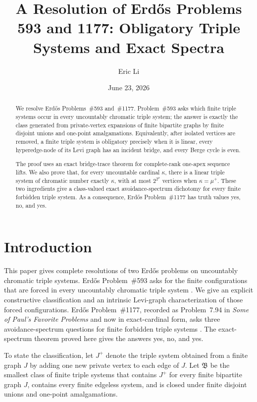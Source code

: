 \documentclass[11pt]{amsart}
\author@andify\authors
\title[Erd\H{o}s Problems 593 and 1177]
{A Resolution of Erd\H{o}s Problems 593 and 1177: Obligatory Triple Systems and Exact Spectra}
\author{Eric Li}
\affiliation{Trinity College, University of Cambridge}
\date{June 23, 2026}
\theoremstyle{definition}
\theoremstyle{remark}
\numberwithin{equation}{section}
\newcommand{\Bclass}{\mathfrak B}
\begin{document}
\begin{abstract}
We resolve Erd\H{o}s Problems~\#593 and~\#1177.  Problem~\#593 asks which
finite triple systems occur in every uncountably chromatic triple system; the
answer is exactly the class generated from private-vertex expansions of finite
bipartite graphs by finite disjoint unions and one-point amalgamations.
Equivalently, after isolated vertices are removed, a finite triple system is
obligatory precisely when it is linear, every hyperedge-node of its Levi graph
has an incident bridge, and every Berge cycle is even.

The proof uses an exact bridge-trace theorem for complete-rank one-apex sequence
lifts.  We also prove that, for every uncountable cardinal $\kappa$, there is a
linear triple system of chromatic number exactly $\kappa$, with at most
$2^{2^\mu}$ vertices when $\kappa=\mu^+$.  These two ingredients give a
class-valued exact avoidance-spectrum dichotomy for every finite forbidden
triple system.  As a consequence, Erd\H{o}s Problem~\#1177 has truth values
yes, no, and yes.
\end{abstract}

\maketitle

\section{Introduction}

This paper gives complete resolutions of two Erd\H{o}s problems on
uncountably chromatic triple systems.  Erd\H{o}s Problem~\#593 asks for the
finite configurations that are forced in every uncountably chromatic triple
system \cite{Erdos1995,Erdos593}.  We give an explicit constructive
classification and an intrinsic Levi-graph characterization of those forced
configurations.  Erd\H{o}s Problem~\#1177, recorded as Problem~7.94 in
\emph{Some of Paul's Favorite Problems} and now in exact-cardinal form, asks
three avoidance-spectrum questions for finite forbidden triple systems
\cite[Problem~7.94, p.~14]{Va99}\cite{Erdos1177}.  The exact-spectrum theorem
proved here gives the answers yes, no, and yes.

To state the classification, let $J^+$ denote the triple system obtained from a
finite graph $J$ by adding one new private vertex to each edge of $J$.  Let
$\Bclass$ be the smallest class of finite triple systems that contains $J^+$ for
every finite bipartite graph $J$, contains every finite edgeless system, and is
closed under finite disjoint unions and one-point amalgamations.
\end{document}
